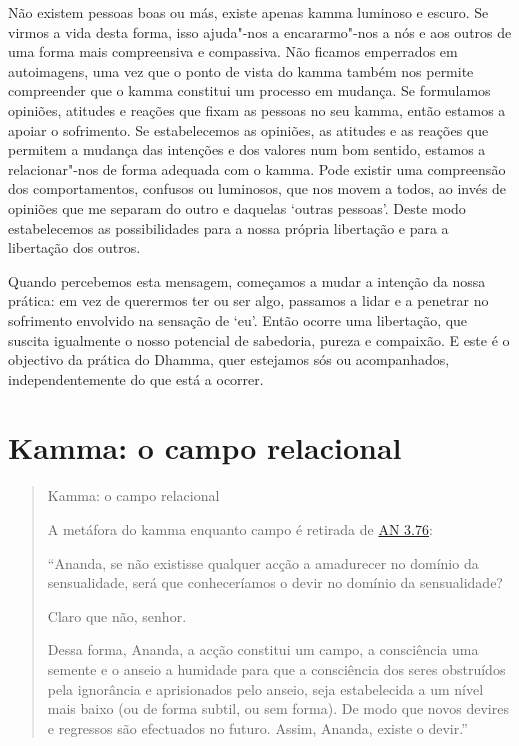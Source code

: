 Não existem pessoas boas ou más, existe apenas kamma luminoso e escuro. Se virmos a vida desta forma, isso ajuda"-nos a encararmo"-nos a nós e aos outros de uma forma mais compreensiva e compassiva. Não ficamos emperrados em autoimagens, uma vez que o ponto de vista do kamma também nos permite compreender que o kamma constitui um processo em mudança. Se formulamos opiniões, atitudes e reações que fixam as pessoas no seu kamma, então estamos a apoiar o sofrimento. Se estabelecemos as opiniões, as atitudes e as reações que permitem a mudança das intenções e dos valores num bom sentido, estamos a relacionar"-nos de forma adequada com o kamma. Pode existir uma compreensão dos comportamentos, confusos ou luminosos, que nos movem a todos, ao invés de opiniões que me separam do outro e daquelas `outras pessoas'. Deste modo estabelecemos as possibilidades para a nossa própria libertação e para a libertação dos outros.

Quando percebemos esta mensagem, começamos a mudar a intenção da nossa prática: em vez de querermos ter ou ser algo, passamos a lidar e a penetrar no sofrimento envolvido na sensação de `eu'. Então ocorre uma libertação, que suscita igualmente o nosso potencial de sabedoria, pureza e compaixão. E este é o objectivo da prática do Dhamma, quer estejamos sós ou acompanhados, independentemente do que está a ocorrer.

\section{Kamma: o campo relacional}


\begin{quote}
  Kamma: o campo relacional

  A metáfora do kamma enquanto campo é retirada de \href{https://suttacentral.net/an3.76/en/thanissaro}{AN 3.76}:

  ``Ananda, se não existisse qualquer acção a amadurecer no domínio da sensualidade, será que conheceríamos o devir no domínio da sensualidade?

  Claro que não, senhor.

  Dessa forma, Ananda, a acção constitui um campo, a consciência uma semente e o anseio a humidade para que a consciência dos seres obstruídos pela ignorância e aprisionados pelo anseio, seja estabelecida a um nível mais baixo (ou de forma subtil, ou sem forma). De modo que novos devires e regressos são efectuados no futuro. Assim, Ananda, existe o devir.''
\end{quote}

